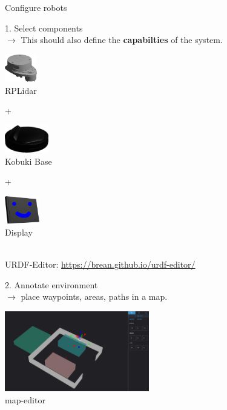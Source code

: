 \documentclass[aspectratio=169]{beamer}
\begin{document}
\begin{frame}{Configure robots}
    \begin{minipage}{0.45\textwidth}
        \begin{block}{}
            1. Select components\\
            \tiny $\rightarrow$ This should also define the \textbf{capabilties} of the system.
        \end{block}
        \begin{minipage}{0.27\textwidth}
            \includegraphics[height=1.2cm]{figures/rplidar.png}\\
            \small
            RPLidar
        \end{minipage} + \begin{minipage}{0.27\textwidth}
            \includegraphics[height=1.2cm]{figures/kobuki_base.png}\\
            \small
            Kobuki Base
        \end{minipage} + \begin{minipage}{0.27\textwidth}
            \includegraphics[height=1.2cm]{figures/display.png}\\
            \small
            Display
        \end{minipage}
        \vspace{1em}\\
        \tiny URDF-Editor: \url{https://brean.github.io/urdf-editor/}
    \end{minipage}\begin{minipage}{0.07\textwidth}
        \hspace{0.1cm}
    \end{minipage}\begin{minipage}{0.45\textwidth}
        \begin{block}{}
            2. Annotate environment\\
            \tiny $\rightarrow$ place waypoints, areas, paths in a map.
        \end{block}
        \includegraphics[height=3.5cm]{figures/map_editor_basic_scene.png}\\
        \tiny map-editor
    \end{minipage}
\end{frame}
\end{document}
